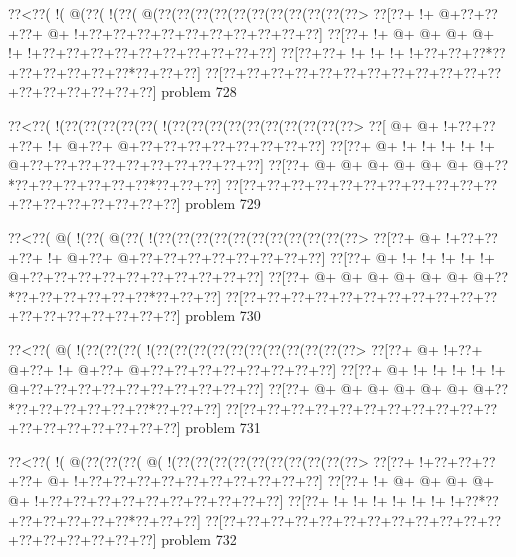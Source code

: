 \vbox{\vbox{\goo
\0??<\0??(\- !(\- @(\0??(\- !(\0??(\- @(\0??(\0??(\0??(\0??(\0??(\0??(\0??(\0??(\0??(\0??(\0??>
\0??[\0??+\- !+\- @+\0??+\0??+\0??+\- @+\- !+\0??+\0??+\0??+\0??+\0??+\0??+\0??+\0??+\0??+\0??]
\0??[\0??+\- !+\- @+\- @+\- @+\- @+\- !+\- !+\0??+\0??+\0??+\0??+\0??+\0??+\0??+\0??+\0??+\0??]
\0??[\0??+\0??+\- !+\- !+\- !+\- !+\0??+\0??+\0??*\0??+\0??+\0??+\0??+\0??+\0??*\0??+\0??+\0??]
\0??[\0??+\0??+\0??+\0??+\0??+\0??+\0??+\0??+\0??+\0??+\0??+\0??+\0??+\0??+\0??+\0??+\0??+\0??]
}
\hfil problem 728\hfil\break
}



\vbox{\vbox{\goo
\0??<\0??(\- !(\0??(\0??(\0??(\0??(\0??(\- !(\0??(\0??(\0??(\0??(\0??(\0??(\0??(\0??(\0??(\0??>
\0??[\- @+\- @+\- !+\0??+\0??+\0??+\- !+\- @+\0??+\- @+\0??+\0??+\0??+\0??+\0??+\0??+\0??+\0??]
\0??[\0??+\- @+\- !+\- !+\- !+\- !+\- !+\- @+\0??+\0??+\0??+\0??+\0??+\0??+\0??+\0??+\0??+\0??]
\0??[\0??+\- @+\- @+\- @+\- @+\- @+\- @+\- @+\0??*\0??+\0??+\0??+\0??+\0??+\0??*\0??+\0??+\0??]
\0??[\0??+\0??+\0??+\0??+\0??+\0??+\0??+\0??+\0??+\0??+\0??+\0??+\0??+\0??+\0??+\0??+\0??+\0??]
}
\hfil problem 729\hfil\break
}



\vbox{\vbox{\goo
\0??<\0??(\- @(\- !(\0??(\- @(\0??(\- !(\0??(\0??(\0??(\0??(\0??(\0??(\0??(\0??(\0??(\0??(\0??>
\0??[\0??+\- @+\- !+\0??+\0??+\0??+\- !+\- @+\0??+\- @+\0??+\0??+\0??+\0??+\0??+\0??+\0??+\0??]
\0??[\0??+\- @+\- !+\- !+\- !+\- !+\- !+\- @+\0??+\0??+\0??+\0??+\0??+\0??+\0??+\0??+\0??+\0??]
\0??[\0??+\- @+\- @+\- @+\- @+\- @+\- @+\- @+\0??*\0??+\0??+\0??+\0??+\0??+\0??*\0??+\0??+\0??]
\0??[\0??+\0??+\0??+\0??+\0??+\0??+\0??+\0??+\0??+\0??+\0??+\0??+\0??+\0??+\0??+\0??+\0??+\0??]
}
\hfil problem 730\hfil\break
}



\vbox{\vbox{\goo
\0??<\0??(\- @(\- !(\0??(\0??(\0??(\- !(\0??(\0??(\0??(\0??(\0??(\0??(\0??(\0??(\0??(\0??(\0??>
\0??[\0??+\- @+\- !+\0??+\- @+\0??+\- !+\- @+\0??+\- @+\0??+\0??+\0??+\0??+\0??+\0??+\0??+\0??]
\0??[\0??+\- @+\- !+\- !+\- !+\- !+\- !+\- @+\0??+\0??+\0??+\0??+\0??+\0??+\0??+\0??+\0??+\0??]
\0??[\0??+\- @+\- @+\- @+\- @+\- @+\- @+\- @+\0??*\0??+\0??+\0??+\0??+\0??+\0??*\0??+\0??+\0??]
\0??[\0??+\0??+\0??+\0??+\0??+\0??+\0??+\0??+\0??+\0??+\0??+\0??+\0??+\0??+\0??+\0??+\0??+\0??]
}
\hfil problem 731\hfil\break
}



\vbox{\vbox{\goo
\0??<\0??(\- !(\- @(\0??(\0??(\0??(\- @(\- !(\0??(\0??(\0??(\0??(\0??(\0??(\0??(\0??(\0??(\0??>
\0??[\0??+\- !+\0??+\0??+\0??+\0??+\- @+\- !+\0??+\0??+\0??+\0??+\0??+\0??+\0??+\0??+\0??+\0??]
\0??[\0??+\- !+\- @+\- @+\- @+\- @+\- @+\- !+\0??+\0??+\0??+\0??+\0??+\0??+\0??+\0??+\0??+\0??]
\0??[\0??+\- !+\- !+\- !+\- !+\- !+\- !+\- !+\0??*\0??+\0??+\0??+\0??+\0??+\0??*\0??+\0??+\0??]
\0??[\0??+\0??+\0??+\0??+\0??+\0??+\0??+\0??+\0??+\0??+\0??+\0??+\0??+\0??+\0??+\0??+\0??+\0??]
}
\hfil problem 732\hfil\break
}



